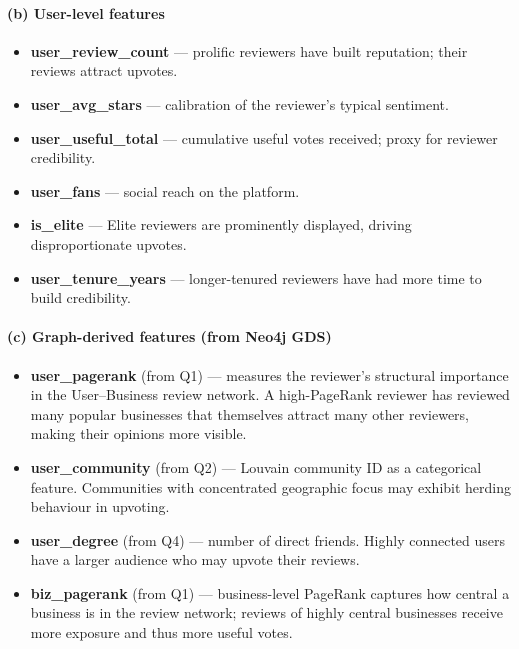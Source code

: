 \documentclass[11pt,a4paper]{article}
\begin{document}
\paragraph{(b) User-level features}
\begin{itemize}[noitemsep]
  \item \textbf{user\_review\_count} — prolific reviewers have built reputation; their reviews attract upvotes.
  \item \textbf{user\_avg\_stars} — calibration of the reviewer's typical sentiment.
  \item \textbf{user\_useful\_total} — cumulative useful votes received; proxy for reviewer credibility.
  \item \textbf{user\_fans} — social reach on the platform.
  \item \textbf{is\_elite} — Elite reviewers are prominently displayed, driving disproportionate upvotes.
  \item \textbf{user\_tenure\_years} — longer-tenured reviewers have had more time to build credibility.
\end{itemize}

\paragraph{(c) Graph-derived features (from Neo4j GDS)}
\begin{itemize}[noitemsep]
  \item \textbf{user\_pagerank} (from Q1) — measures the reviewer's structural importance in the
    User–Business review network.  A high-PageRank reviewer has reviewed many popular businesses
    that themselves attract many other reviewers, making their opinions more visible.
  \item \textbf{user\_community} (from Q2) — Louvain community ID as a categorical feature.
    Communities with concentrated geographic focus may exhibit herding behaviour in upvoting.
  \item \textbf{user\_degree} (from Q4) — number of direct friends.  Highly connected users have a
    larger audience who may upvote their reviews.
  \item \textbf{biz\_pagerank} (from Q1) — business-level PageRank captures how central a business is
    in the review network; reviews of highly central businesses receive more exposure and thus more
    useful votes.
\end{itemize}

\end{document}
